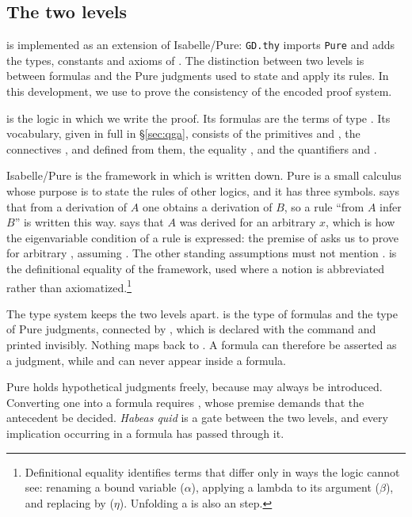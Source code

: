 \documentclass[11pt]{article}
\begin{document}
\subsection{The two levels}
\label{sec:levels}

\QGA{} is implemented as an extension of Isabelle/Pure: \texttt{GD.thy}
imports \texttt{Pure} and adds the types, constants and axioms of \QGA{}.
The distinction between two levels is between \QGA{} formulas and the Pure
judgments used to state and apply its rules.  In this development, we use
\QGA{} to prove the consistency of the encoded \BGA{} proof system.

\QGA{} is the logic in which we write the proof.  Its formulas are the terms of type .
Its vocabulary, given in full in \S\ref{sec:qga}, consists of the primitives
 and , the connectives ,  and  defined from
them, the equality \isa{=}, and the quantifiers  and .

Isabelle/Pure is the framework in which \QGA{} is written down.  Pure is a small
calculus whose purpose is to state the rules of other logics, and it has three
symbols.   says that from a derivation of $A$ one obtains a derivation
of $B$, so a rule ``from $A$ infer $B$'' is written this way.   says
that $A$ was derived for an arbitrary $x$, which is how the eigenvariable
condition of a rule is expressed: the premise  of
 asks us to prove  for arbitrary , assuming
.  The other standing assumptions must not mention .   is the definitional equality of the framework, used where a
\QGA{} notion is abbreviated rather than axiomatized.\footnote{%
  Definitional equality identifies terms that differ only in ways the logic
  cannot see: renaming a bound variable ($\alpha$), applying a lambda to its
  argument ($\beta$), and replacing  by  ($\eta$).  Unfolding
  a  is also an  step.}

The type system keeps the two levels apart.   is the type of \QGA{}
formulas and  the type of Pure judgments, connected by
, which is declared with the  command and
printed invisibly.  Nothing maps  back to .  A \QGA{} formula can
therefore be asserted as a judgment, while  and  can never appear
inside a \QGA{} formula.

Pure holds hypothetical judgments freely, because  may always be
introduced.  Converting one into a \QGA{} formula requires , whose
premise  demands that the antecedent be decided.  \emph{Habeas quid} is
a gate between the two levels, and every implication occurring in a
\QGA{} formula has passed through it.
\end{document}

